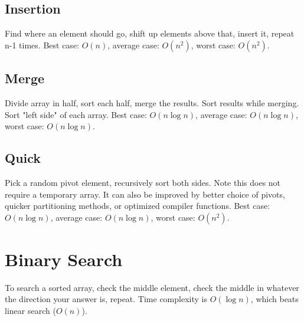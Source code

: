 \documentclass[12pt]{article}
\begin{document}
\subsection*{Insertion}
Find where an element should go, shift up elements above that, insert it, repeat n-1 times. Best case: $O(n)$, average case: $O(n^2)$, worst case: $O(n^2)$.

\subsection*{Merge}
Divide array in half, sort each half, merge the results. Sort results while merging. Sort "left side" of each array. Best case: $O(n \log n)$, average case: $O(n \log n)$, worst case: $O(n \log n)$.

\subsection*{Quick}
Pick a random pivot element, recursively sort both sides. Note this does not require a temporary array. It can also be improved by better choice of pivots, quicker partitioning methods, or optimized compiler functions. Best case: $O(n \log n)$, average case: $O(n \log n)$, worst case: $O(n^2)$.

\section*{Binary Search}
To search a sorted array, check the middle element, check the middle in whatever the direction your answer is, repeat. Time complexity is $O(\log n)$, which beats linear search ($O(n)$).
\end{document}
